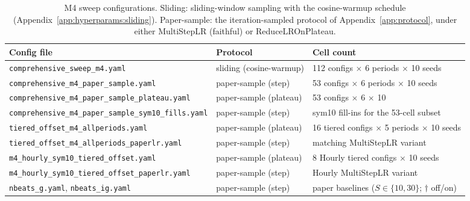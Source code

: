 \begin{table}[h]
\centering
\small
\caption{M4 sweep configurations. Sliding: sliding-window sampling with the
cosine-warmup schedule (Appendix~\ref{app:hyperparams:sliding}).
Paper-sample: the iteration-sampled protocol of
Appendix~\ref{app:protocol}, under either MultiStepLR (faithful) or
ReduceLROnPlateau.}
\label{tab:configs_m4}
\begin{tabular}{@{}lll@{}}
\toprule
Config file & Protocol & Cell count \\
\midrule
\texttt{comprehensive\_sweep\_m4.yaml} & sliding (cosine-warmup) & 112 configs $\times$ 6 periods $\times$ 10 seeds \\
\texttt{comprehensive\_m4\_paper\_sample.yaml} & paper-sample (step) & 53 configs $\times$ 6 periods $\times$ 10 seeds \\
\texttt{comprehensive\_m4\_paper\_sample\_plateau.yaml} & paper-sample (plateau) & 53 configs $\times$ 6 $\times$ 10 \\
\texttt{comprehensive\_m4\_paper\_sample\_sym10\_fills.yaml} & paper-sample (step) & sym10 fill-ins for the 53-cell subset \\
\texttt{tiered\_offset\_m4\_allperiods.yaml} & paper-sample (plateau) & 16 tiered configs $\times$ 5 periods $\times$ 10 seeds \\
\texttt{tiered\_offset\_m4\_allperiods\_paperlr.yaml} & paper-sample (step) & matching MultiStepLR variant \\
\texttt{m4\_hourly\_sym10\_tiered\_offset.yaml} & paper-sample (plateau) & 8 Hourly tiered configs $\times$ 10 seeds \\
\texttt{m4\_hourly\_sym10\_tiered\_offset\_paperlr.yaml} & paper-sample (step) & Hourly MultiStepLR variant \\
\texttt{nbeats\_g.yaml}, \texttt{nbeats\_ig.yaml} & paper-sample (step) & paper baselines ($S \in \{10,30\}$; $\dagger$ off/on) \\
\bottomrule
\end{tabular}
\end{table}

